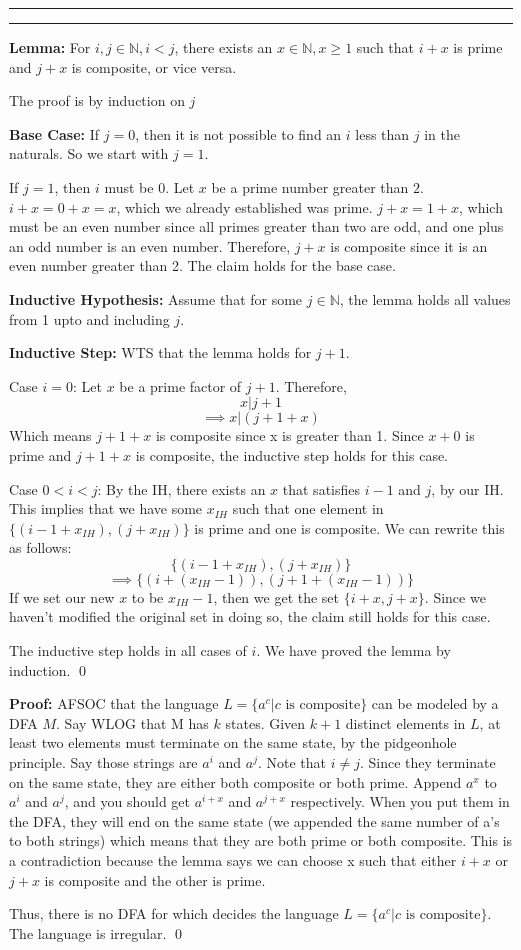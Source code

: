\documentclass[11pt]{article}
\newcounter{questionCounter}
\newcounter{partCounter}[questionCounter]
\newenvironment{question}[2][\arabic{questionCounter}]{%
    \setcounter{partCounter}{0}%
    \vspace{.25in} \hrule \vspace{0.5em}%
        \noindent{\bf #2}%
    \vspace{0.8em} \hrule \vspace{.10in}%
    \addtocounter{questionCounter}{1}%
}{}
\begin{document}
\begin{question}{Grace}
\textbf{Lemma:} For $i,j \in \mathbb{N}, i < j$, there exists an $x\in\mathbb{N}, x\geq1$ such that $i+x$ is prime and 
$j+x$ is composite, or vice versa.

The proof is by induction on $j$

\textbf{Base Case:} If $j=0$, then it is not possible to find an $i$ less than $j$ in the naturals.
So we start with $j = 1$. 

If $j = 1$, then $i$ must be 0. Let $x$ be a prime number greater than $2$. $i+x = 0+x = x$, which we already
established was prime. $j+x =1+x$, which must be an even number since all primes greater than two are odd, and one plus
an odd number is an even number. Therefore, $j+x$ is composite since it is an even number greater than 2.
The claim holds for the base case.

\textbf{Inductive Hypothesis:}
Assume that for some $j \in \mathbb{N}$, the lemma holds all values from 1 upto and including $j$.

\textbf{Inductive Step:}
WTS that the lemma holds for $j+1$.

Case $i=0$:
Let $x$ be a prime factor of $j+1$. Therefore, 
$$x|j+1$$
$$\implies x|(j+1+x)$$
Which means $j+1+x$ is composite since x is greater than 1.
Since $x+0$ is prime and $j+1+x$ is composite, the inductive step holds for this case.

Case $0 < i < j$:
By the IH, there exists an $x$ that satisfies $i-1$ and $j$, by our IH.
This implies that we have some $x_{IH}$ such that one element in $\{(i-1+x_{IH}),(j+x_{IH})\}$ is prime and one is composite.
We can rewrite this as follows:
$$\{(i-1+x_{IH}),(j+x_{IH})\}$$
$$\implies \{(i+(x_{IH}-1)),(j+1+(x_{IH}-1))\}$$
If we set our new $x$ to be $x_{IH}-1$, then we get the set $\{i+x,j+x\}$.
Since we haven't modified the original set in doing so, the claim still holds for this case.

The inductive step holds in all cases of $i$. We have proved the lemma by induction. \qed 

\textbf{Proof:}
AFSOC that the language $L= \{a^c | c\text{ is composite}\}$ can be modeled by a DFA $M$. Say WLOG that M has
$k$ states. Given $k+1$ distinct elements in $L$, at least two elements must terminate on the same
state, by the pidgeonhole principle. Say those strings are $a^i$ and $a^j$. Note that $i\neq j$. Since they terminate
on the same state, they are either both composite or both prime. Append $a^x$ to $a^i$ and $a^j$, and you should
get $a^{i+x}$ and $a^{j+x}$ respectively. When you put them in the
DFA, they will end on the same state (we appended the same number of a's to both strings) which means that they are 
both prime or both composite. This is a contradiction because the lemma says we can choose x such that
either $i+x$ or $j+x$ is composite and the other is prime.

Thus, there is no DFA for which decides the language $L= \{a^c | c\text{ is composite}\}$. The language is irregular. \qed
\end{question}
\end{document}
